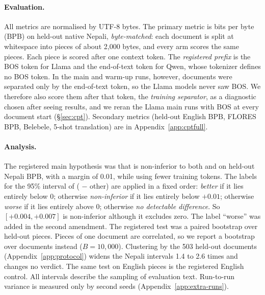 \paragraph{Evaluation.} All metrics are normalised by UTF-8 bytes. The primary metric is bits per byte (BPB) on held-out native Nepali, \emph{byte-matched}: each document is split at whitespace into pieces of about 2{,}000 bytes, and every arm scores the same pieces. Each piece is scored after one context token. The \emph{registered prefix} is the BOS token for Llama and the end-of-text token for Qwen, whose tokenizer defines no BOS token. In the main and warm-up runs, however, documents were separated only by the end-of-text token, so the Llama models never saw BOS. We therefore also score them after that token, the \emph{training separator}, as a diagnostic chosen after seeing results, and we reran the Llama main runs with BOS at every document start (\S\ref{sec:cpt}). Secondary metrics (held-out English BPB, FLORES BPB, Belebele, 5-shot translation) are in Appendix~\ref{app:cptfull}.

\paragraph{Analysis.} The registered main hypothesis was that \RII{} is non-inferior to both \RI{} and \RO{} on held-out Nepali BPB, with a margin of 0.01, while using fewer training tokens. The labels for the 95\% interval of (\RII{} $-$ other) are applied in a fixed order: \emph{better} if it lies entirely below 0; otherwise \emph{non-inferior} if it lies entirely below $+0.01$; otherwise \emph{worse} if it lies entirely above 0; otherwise \emph{no detectable difference}. So $[+0.004, +0.007]$ is non-inferior although it excludes zero. The label ``worse'' was added in the second amendment. The registered test was a paired bootstrap over held-out pieces. Pieces of one document are correlated, so we report a bootstrap over documents instead ($B{=}10{,}000$). Clustering by the 503 held-out documents (Appendix~\ref{app:protocol}) widens the Nepali intervals 1.4 to 2.6 times and changes no verdict. The same test on English pieces is the registered English control. All intervals describe the sampling of evaluation text. Run-to-run variance is measured only by second seeds (Appendix~\ref{app:extra-runs}).

